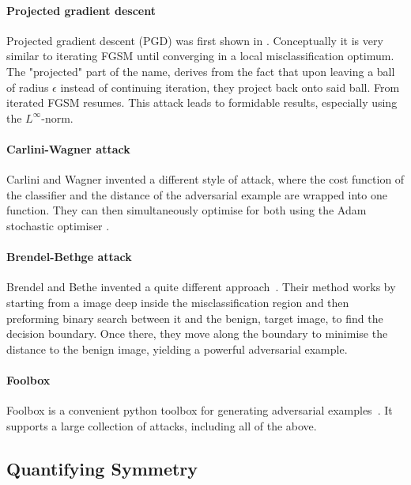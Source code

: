 \documentclass{article}
\begin{document}
\paragraph{Projected gradient descent}
Projected gradient descent (PGD) was first shown in \cite{madry2017towards}. Conceptually it is very similar to iterating FGSM until converging in a local misclassification optimum. The "projected" part of the name, derives from the fact that upon leaving a ball of radius $\epsilon$ instead of continuing iteration, they project back onto said ball. From iterated FGSM resumes.
This attack leads to formidable results, especially using the $L^\infty$-norm.



\paragraph{Carlini-Wagner attack}

Carlini and Wagner \cite{carlini2017towards} invented a different style of attack, where the cost function of the classifier and the distance of the adversarial example are wrapped into one function. They can then simultaneously optimise for both using the Adam stochastic optimiser \cite{kingma2017adam}.

\paragraph{Brendel-Bethge attack}

Brendel and Bethe invented a quite different approach~\cite{brendel2019accurate}.
Their method works by starting from a image deep inside the misclassification region and then preforming binary search between it and the benign, target image, to find the decision boundary. Once there, they move along the boundary to minimise the distance to the benign image, yielding a powerful adversarial example.

\paragraph{Foolbox}
Foolbox is a convenient python toolbox for generating adversarial examples~\cite{rauber2017foolbox}. It supports a large collection of attacks, including all of the above.

\subsection{Quantifying Symmetry}
\end{document}
